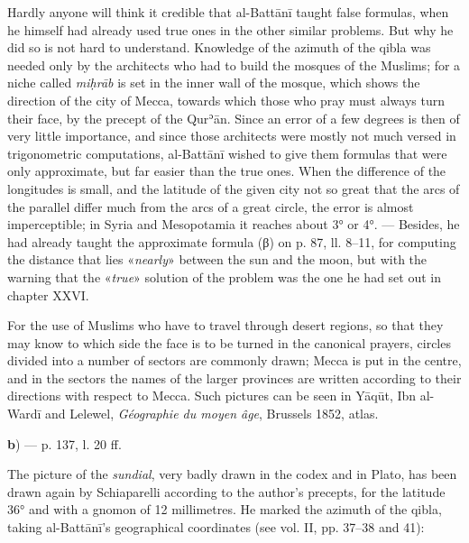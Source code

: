 \documentclass[11pt]{article}
\newcommand{\Pg}[1]{\marginpar{\footnotesize\color{gray}#1}}
\begin{document}
\par Hardly anyone will think it credible that al-Battānī taught false formulas, when he himself had already used true ones in the other similar problems. But why he did so is not hard to understand. Knowledge of the azimuth of the qibla was needed only by the architects who had to build the mosques of the Muslims; for a niche called \emph{miḥrāb} is set in the inner wall of the mosque, which shows the direction of the city of Mecca, towards which those who pray must always turn their face, by the precept of the Qurʾān. Since an error of a few degrees is then of very little importance, and since those architects were mostly not much versed in trigonometric computations, al-Battānī wished to give them formulas that were only approximate, but far easier than the true ones. When the difference of the longitudes is small, and the latitude of the given city not so great that the arcs of the parallel differ much from the arcs of a great circle, the error is almost imperceptible; in Syria and Mesopotamia it reaches about 3° or 4°. — Besides, he had already taught the approximate formula ({\greekfont β}) on p. 87, ll. 8–11, for computing the distance that lies «\emph{nearly}» between the sun and the moon, but with the warning that the «\emph{true}» solution of the problem was the one he had set out in chapter XXVI.\par
\par \Pg{I 319}For the use of Muslims who have to travel through desert regions, so that they may know to which side the face is to be turned in the canonical prayers, circles divided into a number of sectors are commonly drawn; Mecca is put in the centre, and in the sectors the names of the larger provinces are written according to their directions with respect to Mecca. Such pictures can be seen in Yāqūt, Ibn al-Wardī and Lelewel, \emph{Géographie du moyen âge}, Brussels 1852, atlas.\par
\par\begin{center}\textbf{b}) — p. 137, l. 20 ff.\end{center}
\par The picture of the \emph{sundial}, very badly drawn in the codex and in Plato, has been drawn again by Schiaparelli according to the author's precepts, for the latitude 36° and with a gnomon of 12 millimetres. He marked the azimuth of the qibla, taking al-Battānī's geographical coordinates (see vol. II, pp. 37–38 and 41):\par
\end{document}

